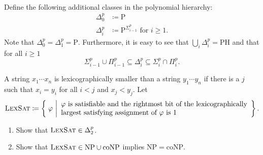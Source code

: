 \documentclass[english]{uebung_cs}
\begin{document}
\begin{aufgabe}\mbox{}\\
  Define the following additional classes in the polynomial hierarchy:
  \begin{align*}
    \Delta_0^p &\coloneqq \mathrm{P}\\
    \Delta_i^p &\coloneqq \mathrm{P}^{\Sigma_{i-1}^p} \text{ for } i \geq 1.
  \end{align*}
  Note that $\Delta_0^p = \Delta_1^p = \mathrm{P}$.
  Furthermore, it is easy to see that $\bigcup_i \Delta_i^p = \mathrm{PH}$ and that for all $i \geq 1$
  \[\Sigma_{i-1}^p \cup \Pi_{i-1}^p \subseteq \Delta_i^p \subseteq \Sigma_i^p \cap \Pi_i^p.\]
  
  A string $x_1 \cdots x_n$ is lexicographically smaller than a string $y_1 \cdots y_n$ if there is a $j$ such that $x_i = y_i$ for all $i<j$ and $x_j < y_j$.
  Let
  \[\textsc{LexSat} \coloneqq \left\{\; \varphi \ \middle| \begin{array}{l}\varphi \text{ is satisfiable and the rightmost bit of the lexicographically}\\ \text{largest satisfying assignment of } \varphi \text{ is } 1\end{array} \right\}.\]

  \begin{enumerate}
    \item Show that $\textsc{LexSat} \in \Delta_2^p$.
    \item Show that $\textsc{LexSat} \in \mathrm{NP} \cup \mathrm{coNP}$ implies $\mathrm{NP} = \mathrm{coNP}$.
  \end{enumerate}
\end{aufgabe}
\end{document}
